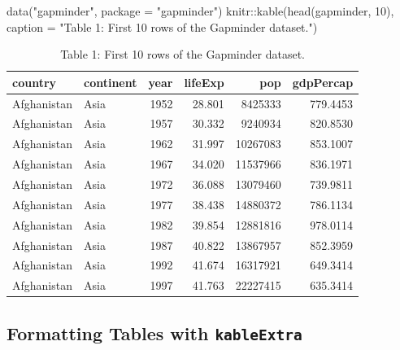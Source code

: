 \documentclass[
]{book}
\newenvironment{Shaded}{\begin{snugshade}}{\end{snugshade}}
\newcommand{\AttributeTok}[1]{\textcolor[rgb]{0.77,0.63,0.00}{#1}}
\newcommand{\DecValTok}[1]{\textcolor[rgb]{0.00,0.00,0.81}{#1}}
\newcommand{\FunctionTok}[1]{\textcolor[rgb]{0.00,0.00,0.00}{#1}}
\newcommand{\NormalTok}[1]{#1}
\newcommand{\SpecialCharTok}[1]{\textcolor[rgb]{0.00,0.00,0.00}{#1}}
\newcommand{\StringTok}[1]{\textcolor[rgb]{0.31,0.60,0.02}{#1}}
\begin{document}
\begin{Shaded}
\begin{Highlighting}[]
\FunctionTok{data}\NormalTok{(}\StringTok{"gapminder"}\NormalTok{, }\AttributeTok{package =} \StringTok{"gapminder"}\NormalTok{)}
\NormalTok{knitr}\SpecialCharTok{::}\FunctionTok{kable}\NormalTok{(}\FunctionTok{head}\NormalTok{(gapminder, }\DecValTok{10}\NormalTok{), }\AttributeTok{caption =} \StringTok{"Table 1: First 10 rows of the Gapminder dataset."}\NormalTok{)}
\end{Highlighting}
\end{Shaded}

\begin{table}

\caption{\label{tab:unnamed-chunk-2}Table 1: First 10 rows of the Gapminder dataset.}
\centering
\begin{tabular}[t]{l|l|r|r|r|r}
\hline
country & continent & year & lifeExp & pop & gdpPercap\\
\hline
Afghanistan & Asia & 1952 & 28.801 & 8425333 & 779.4453\\
\hline
Afghanistan & Asia & 1957 & 30.332 & 9240934 & 820.8530\\
\hline
Afghanistan & Asia & 1962 & 31.997 & 10267083 & 853.1007\\
\hline
Afghanistan & Asia & 1967 & 34.020 & 11537966 & 836.1971\\
\hline
Afghanistan & Asia & 1972 & 36.088 & 13079460 & 739.9811\\
\hline
Afghanistan & Asia & 1977 & 38.438 & 14880372 & 786.1134\\
\hline
Afghanistan & Asia & 1982 & 39.854 & 12881816 & 978.0114\\
\hline
Afghanistan & Asia & 1987 & 40.822 & 13867957 & 852.3959\\
\hline
Afghanistan & Asia & 1992 & 41.674 & 16317921 & 649.3414\\
\hline
Afghanistan & Asia & 1997 & 41.763 & 22227415 & 635.3414\\
\hline
\end{tabular}
\end{table}

\hypertarget{formatting-tables-with-kableextra}{%
\subsection{\texorpdfstring{Formatting Tables with \texttt{kableExtra}}{Formatting Tables with kableExtra}}\label{formatting-tables-with-kableextra}}
\end{document}
